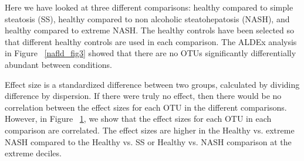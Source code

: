 \begin{figure}[h]
\begin{center}
\label{nafld_fig4}
\end{center}
\end{figure}

\FloatBarrier
Here we have looked at three different comparisons: healthy compared to simple steatosis (SS), healthy compared to non alcoholic steatohepatosis (NASH), and healthy compared to extreme NASH. The healthy controls have been selected so that different healthy controls are used in each comparison. The ALDEx analysis in Figure ~\ref{nafld_fig3} showed that there are no OTUs significantly differentially abundant between conditions.

Effect size is a standardized difference between two groups, calculated by dividing difference by dispersion. If there were truly no effect, then there would be no correlation between the effect sizes for each OTU in the different comparisons. However, in Figure ~\ref{nafld_fig4}, we show that the effect sizes for each OTU in each comparison are correlated. The effect sizes are higher in the Healthy vs. extreme NASH compared to the Healthy vs. SS or Healthy vs. NASH comparison at the extreme deciles.

